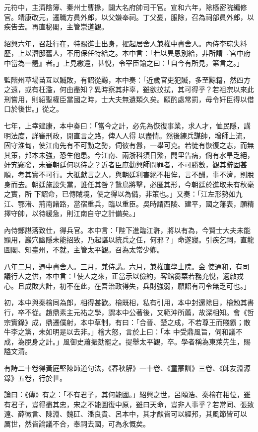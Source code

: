 \begin{pinyinscope}
 元符中，主濟陰簿、秦州士曹掾，闢大名府帥司干官。宣和六年，除樞密院編修官。靖康改元，遷職方員外郎，以父嫌奉祠。丁父憂，服除，召為祠部員外郎，以疾告去。再直秘閣，主管崇道觀。



 紹興六年，召赴行在，特賜進士出身，擢起居舍人兼權中書舍人。內侍李琮失料歷，上以潛邸舊人，不用保任特給之。本中言：「若以異恩別給，非所謂『宮中府
 中當為一體』者。」上見繳還，甚悅，令宰臣諭之曰：「自今有所見，第言之。」



 監階州草場苗亙以贓敗，有詔從黥，本中奏：「近歲官吏犯贓，多至黥籍，然四方之遠，或有枉濫，何由盡知？異時察其非辜，雖欲抆拭，其可得乎？若祖宗以來此刑嘗用，則紹聖權臣當國之時，士大夫無遺類久矣。願酌處常罰，毋令奸臣得以借口於後世。」從之。



 七年，上幸建康，本中奏曰：「當今之計，必先為恢復事業，求人才，恤民隱，講明法度，詳審刑政，開直言之路，俾人人得
 以盡情。然後練兵謀帥，增師上流，固守淮甸，使江南先有不可動之勢，伺彼有釁，一舉可克。若徒有恢復之志，而無其策，邦本未強，恐生他患。今江南、兩浙科須日繁，閭里告病，倘有水旱乏絕，奸宄竊發，未審朝廷何以待之？近者臣庶勸興師問罪者，不可勝數，觀其辭固甚順，考其實不可行。大抵獻言之人，與朝廷利害絕不相侔，言不酬，事不濟，則脫身而去。朝廷施設失當，誰任其咎？鷙鳥將擊，必匿其形，今朝廷於進取未有秋毫之實，所
 下詔命，已傳賊境，使之得以為備，非策也。」又奏：「江左形勢如九江、鄂渚、荊南諸路，當宿重兵，臨以重臣。吳時謂西陵、建平，國之藩表，願精擇守帥，以待緩急，則江南自守之計備矣。」



 內侍鄭諶落致仕，得兵官。本中言：「陛下進臨江滸，將以有為，今賢士大夫未能顯用，巖穴幽隱未能招致，乃起諶以統兵之任，何邪？」命遂寢。引疾乞祠，直龍圖閣、知臺州，不就，主管太平觀。召為太常少卿。



 八年二月，遷中書舍人。三月，兼侍講。六月，兼權直學士院。金
 使通和，有司議行人之供，本中言：「使人之來，正當示以儉約，客館芻粟若務充悅，適啟戎心。且成敗大計，初不在此，在吾治政得失，兵財強弱，願詔有司令無乏可也。」



 初，本中與秦檜同為郎，相得甚歡。檜既相，私有引用，本中封還除目，檜勉其書行，卒不從。趙鼎素主元祐之學，謂本中公著後，又範沖所薦，故深相知。會《哲宗實錄》成，鼎遷僕射，本中草制，有曰：「合晉、楚之成，不若尊王而賤霸；散牛李之黨，未如明是以去非。」檜大怒，言於上曰：「本
 中受鼎風旨，伺和議不成，為脫身之計。」風御史蕭振劾罷之。提舉太平觀，卒。學者稱為東萊先生，賜謚文清。



 有詩二十卷得黃庭堅陳師道句法，《春秋解》一十卷、《童蒙訓》三卷、《師友淵源錄》五卷，行於世。



 論曰：《傳》有之：「不有君子，其何能國。」紹興之世，呂頤浩、秦檜在相位，雖有君子，豈得盡其忠，宋之不能圖復中原，雖曰天命，豈非人事乎？若常同、張致遠、薛徽言、陳淵、魏矼、潘良貴、呂本中，其才猷皆可以經邦，其風節皆可以
 厲世，然皆論議不合，奉祠去國，可為永慨矣。



\end{pinyinscope}